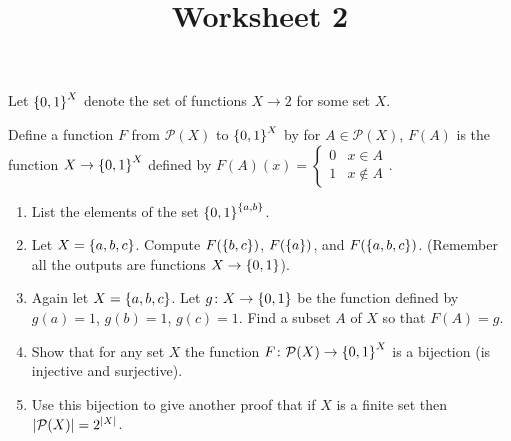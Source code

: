 \documentclass[class=article, crop=false]{standalone}
\title{Worksheet 2}
\begin{document}
  \maketitle
  \newpage
  \begin{problem}{1}
    Let $\left\{0, 1\right\}^X$ denote the set of functions $X\to2$ for some set $X$.\par
    Define a function $F$ from $\mathcal{P}(X)$ to $\left\{0, 1\right\}^X$ by for $A \in \mathcal{P}(X)$, $F(A)$ is the function $X\to \left\{0, 1\right\}^X$ defined by $F(A)(x) = \begin{cases}0 & x\in A \\ 1 & x\notin A\end{cases}$.
    \begin{enumerate}[label=(\alph*)]
      \item List the elements of the set $\left\{0, 1\right\}^{\left\{a, b\right\}}$.
      \item Let $X = \left\{a, b, c\right\}$. Compute $F(\left\{b, c\right\})$, $F(\left\{a\right\})$, and $F(\left\{a, b, c\right\})$. (Remember all the outputs are functions $X\to \left\{0, 1\right\}$).
      \item Again let $X = \left\{a, b, c\right\}$. Let $g\colon X\to \left\{0, 1\right\}$ be the function defined by $g(a) = 1$, $g(b) = 1$, $g(c) = 1$. Find a subset $A$ of $X$ so that $F(A) = g$.
      \item Show that for any set $X$ the function $F\colon \mathcal{P}(X)\to \left\{0, 1\right\}^X$ is a bijection (is injective and surjective).
      \item Use this bijection to give another proof that if $X$ is a finite set then $\left\lvert \mathcal{P}(X) \right\rvert=2^{\left\lvert X \right\rvert}$.
    \end{enumerate}
  \end{problem}
\end{document}
